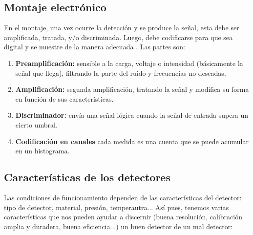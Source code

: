 \subsection{Montaje electrónico}

En el montaje, una vez ocurre la detección y se produce la señal, esta debe ser amplificada, tratada, y/o discriminada. Luego, debe codificarse para que sea digital y se muestre de la manera adecuada . Las partes son: 

\begin{enumerate}
    \item \textbf{Preamplificación:} sensible a la carga, voltaje o intensidad (básicamente la señal que llega), filtrando la parte del ruido y frecuencias no deseadas. 
    \item \textbf{Amplificación:} segunda amplificación, tratando la señal y modifica su forma en función de sus características.
    \item \textbf{Discriminador:} envía una señal lógica cuando la señal de entrada supera un cierto umbral.
    \item \textbf{Codificación en canales} cada medida es una cuenta que se puede acumular en un histograma. 
\end{enumerate}


\subsection{Características de los detectores}

Las condiciones de funcionamiento dependen de las características del detector: tipo de detector, material, presión, temperautra... Así pues, tenemos varias características que nos pueden ayudar a discernir (buena resolución, calibración amplia y duradera, buena eficiencia...) un buen detector de un mal detector:

